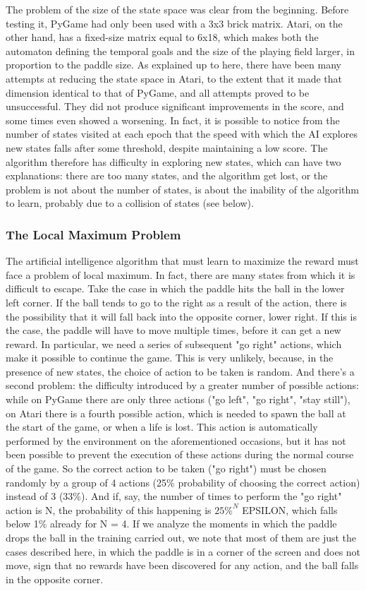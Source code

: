 The problem of the size of the state space was clear from the beginning. Before testing it, PyGame had only been used with a 3x3 brick matrix. Atari, on the other hand, has a fixed-size matrix equal to 6x18, which makes both the automaton defining the temporal goals and the size of the playing field larger, in proportion to the paddle size. As explained up to here, there have been many attempts at reducing the state space in Atari, to the extent that it made that dimension identical to that of PyGame, and all attempts proved to be unsuccessful. They did not produce significant improvements in the score, and some times even showed a worsening. In fact, it is possible to notice from the number of states visited at each epoch that the speed with which the AI explores new states falls after some threshold, despite maintaining a low score. The algorithm therefore has difficulty in exploring new states, which can have two explanations: there are too many states, and the algorithm get lost, or the problem is not about the number of states, is about the inability of the algorithm to learn, probably due to a collision of states (see below).

\subsubsection{The Local Maximum Problem}

The artificial intelligence algorithm that must learn to maximize the reward must face a problem of local maximum. In fact, there are many states from which it is difficult to escape. Take the case in which the paddle hits the ball in the lower left corner. If the ball tends to go to the right as a result of the action, there is the possibility that it will fall back into the opposite corner, lower right. If this is the case, the paddle will have to move multiple times, before it can get a new reward. In particular, we need a series of subsequent "go right" actions, which make it possible to continue the game. This is very unlikely, because, in the presence of new states, the choice of action to be taken is random. And there's a second problem: the difficulty introduced by a greater number of possible actions: while on PyGame there are only three actions ("go left", "go right", "stay still"), on Atari there is a fourth possible action, which is needed to spawn the ball at the start of the game, or when a life is lost. This action is automatically performed by the environment on the aforementioned occasions, but it has not been possible to prevent the execution of these actions during the normal course of the game. So the correct action to be taken ("go right") must be chosen randomly by a group of 4 actions (25\% probability of choosing the correct action) instead of 3 (33\%). And if, say, the number of times to perform the "go right" action is N, the probability of this happening is $25\%^N$ EPSILON, which falls below 1\% already for N = 4. If we analyze the moments in which the paddle drops the ball in the training carried out, we note that most of them are just the cases described here, in which the paddle is in a corner of the screen and does not move, sign that no rewards have been discovered for any action, and the ball falls in the opposite corner.

